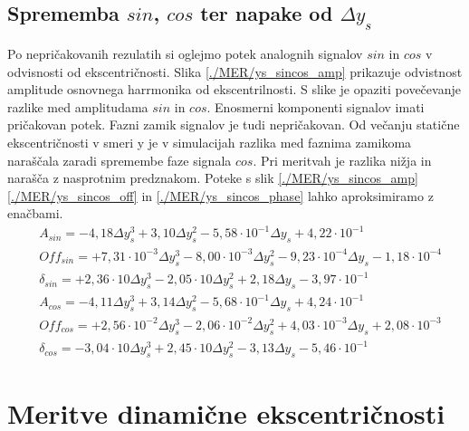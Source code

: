 \subsection{Sprememba $sin$, $cos$ ter napake od $\Delta y_s$}
Po nepričakovanih rezulatih si oglejmo potek analognih signalov $sin$ in $cos$ v odvisnosti od ekscentričnosti. Slika \ref{./MER/ys_sincos_amp} prikazuje odvistnost amplitude osnovnega harrmonika od ekscentrilnosti. 
S slike je opaziti povečevanje razlike med amplitudama $sin$ in $cos$. Enosmerni komponenti signalov imati pričakovan potek. Fazni zamik signalov je tudi nepričakovan. 
Od večanju statične ekscentričnosti v smeri y je v simulacijah razlika med faznima zamikoma naraščala zaradi spremembe faze signala $cos$.
Pri meritvah je razlika nižja in narašča z nasprotnim predznakom.
Poteke s slik \ref{./MER/ys_sincos_amp} \ref{./MER/ys_sincos_off} in \ref{./MER/ys_sincos_phase} lahko aproksimiramo z enačbami. 
\begin{eqnarray}   
&A_{sin} = -4,18\Delta y_s^3+3,10\Delta y_s^2-5,58\cdot 10^{-1} \Delta y_s+4,22\cdot 10^{-1} \\     
&Off_{sin} = +7,31\cdot 10^{-3} \Delta y_s^3-8,00\cdot 10^{-3} \Delta y_s^2-9,23\cdot 10^{-4} \Delta y_s-1,18\cdot 10^{-4} \\   
&\delta_{sin} = +2,36\cdot 10\Delta y_s^3-2,05\cdot 10\Delta y_s^2+2,18\Delta y_s-3,97\cdot 10^{-1} \\
&A_{cos} = -4,11\Delta y_s^3+3,14\Delta y_s^2-5,68\cdot 10^{-1} \Delta y_s+4,24\cdot 10^{-1} \\     
&Off_{cos} = +2,56\cdot 10^{-2}\Delta y_s^3-2,06\cdot 10^{-2}\Delta y_s^2+4,03\cdot 10^{-3}\Delta y_s+2,08\cdot 10^{-3} \\   
&\delta_{cos} = -3,04\cdot 10\Delta y_s^3+2,45\cdot 10\Delta y_s^2-3,13\Delta y_s-5,46\cdot 10^{-1} 
\end{eqnarray}





\section{Meritve dinamične ekscentričnosti}


